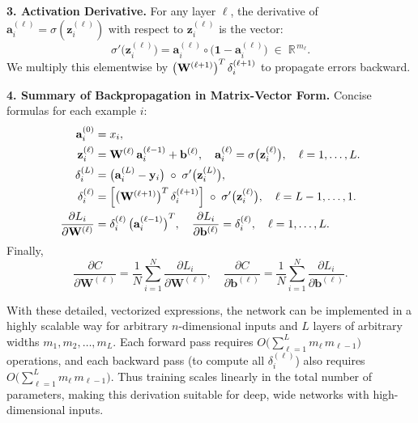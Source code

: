 \documentclass{article}
\begin{document}
\medskip
\noindent \textbf{3. Activation Derivative.}  
For any layer \(\ell\), the derivative of \(\mathbf{a}_{i}^{(\ell)} = \sigma(\mathbf{z}_{i}^{(\ell)})\) with respect to \(\mathbf{z}_{i}^{(\ell)}\) is the vector:
\[
    \sigma'\bigl(\mathbf{z}_{i}^{(\ell)}\bigr) 
    = \mathbf{a}_{i}^{(\ell)} \circ \bigl(\mathbf{1} - \mathbf{a}_{i}^{(\ell)}\bigr)
    \;\in\;\mathbb{R}^{\,m_{\ell}}.
\]
We multiply this elementwise by \(\bigl{(\mathbf{W}^{(\ell+1)}\bigr)}^{T}\,\delta_{i}^{(\ell+1)}\) to propagate errors backward.

\medskip
\noindent \textbf{4. Summary of Backpropagation in Matrix-Vector Form.}  
Concise formulas for each example \(i\):
\[
\begin{aligned}
    \mathbf{a}_{i}^{(0)} &= x_{i}, \\
    \mathbf{z}_{i}^{(\ell)} &= \mathbf{W}^{(\ell)}\,\mathbf{a}_{i}^{(\ell-1)} + \mathbf{b}^{(\ell)}, 
    \quad
    \mathbf{a}_{i}^{(\ell)} = \sigma\bigl(\mathbf{z}_{i}^{(\ell)}\bigr),
    \quad \ell = 1,\ldots,L.\\
    \delta_{i}^{(L)} &= \bigl(\mathbf{a}_{i}^{(L)} - \mathbf{y}_{i}\bigr)\;\circ\;\sigma'\bigl(\mathbf{z}_{i}^{(L)}\bigr), \\
    \delta_{i}^{(\ell)} &= \Bigl[\bigl{(\mathbf{W}^{(\ell+1)}\bigr)}^{T}\,\delta_{i}^{(\ell+1)}\Bigr]
      \;\circ\;\sigma'\bigl(\mathbf{z}_{i}^{(\ell)}\bigr),
    \quad \ell = L-1,\dots,1.\\
    \frac{\partial L_{i}}{\partial \mathbf{W}^{(\ell)}} 
    &= \delta_{i}^{(\ell)}\,{\bigl(\mathbf{a}_{i}^{(\ell-1)}\bigr)}^{T}, 
    \quad
    \frac{\partial L_{i}}{\partial \mathbf{b}^{(\ell)}} 
    = \delta_{i}^{(\ell)}, 
    \quad \ell = 1,\dots,L.
\end{aligned}
\]
Finally,
\[
    \frac{\partial C}{\partial \mathbf{W}^{(\ell)}} 
    = \frac{1}{N}\sum_{i=1}^{N} \frac{\partial L_{i}}{\partial \mathbf{W}^{(\ell)}}, 
    \quad
    \frac{\partial C}{\partial \mathbf{b}^{(\ell)}} 
    = \frac{1}{N}\sum_{i=1}^{N} \frac{\partial L_{i}}{\partial \mathbf{b}^{(\ell)}}.
\]

\vspace{1em}
\noindent With these detailed, vectorized expressions, the network can be implemented in a highly scalable way for arbitrary \(n\)-dimensional inputs and \(L\) layers of arbitrary widths \(m_{1},m_{2},\dots,m_{L}\).  Each forward pass requires \(O\bigl(\sum_{\ell=1}^{L} m_{\ell} \,m_{\ell-1}\bigr)\) operations, and each backward pass (to compute all \(\delta_{i}^{(\ell)}\)) also requires \(O\bigl(\sum_{\ell=1}^{L} m_{\ell} \,m_{\ell-1}\bigr)\).  Thus training scales linearly in the total number of parameters, making this derivation suitable for deep, wide networks with high-dimensional inputs.
\end{document}
